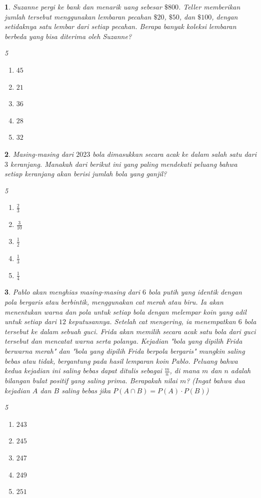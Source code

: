 \documentclass[11pt,a4paper,DIV=12]{scrartcl}
\theoremstyle{problemstyle}
\newtheorem{problem}{}
\theoremstyle{answerstyle}
\newenvironment{choices}[1][5]{%
\raggedcolumns
  \begin{multicols}{#1}%
  \begin{enumerate}[label=(\Alph*)]%
}{%
  \end{enumerate}%
  \end{multicols}%
}
\begin{document}
\begin{problem}
  Suzanne pergi ke bank dan menarik uang sebesar $\$800$. Teller memberikan jumlah tersebut menggunakan lembaran pecahan $\$20$, $\$50$, dan $\$100$, dengan setidaknya satu lembar dari setiap pecahan. Berapa banyak koleksi lembaran berbeda yang bisa diterima oleh Suzanne?

  \begin{choices}
    \item $45$
    \item $21$
    \item $36$
    \item $28$
    \item $32$
  \end{choices}
\end{problem}

\begin{problem}
  Masing-masing dari $2023$ bola dimasukkan secara acak ke dalam salah satu dari $3$ keranjang. Manakah dari berikut ini yang paling mendekati peluang bahwa setiap keranjang akan berisi jumlah bola yang ganjil?
  \begin{choices}
    \item $\frac{2}{3}$
    \item $\frac{3}{10}$
    \item $\frac{1}{2}$
    \item $\frac{1}{3}$
    \item $\frac{1}{4}$
  \end{choices}
\end{problem}

\begin{problem}
  Pablo akan menghias masing-masing dari $6$ bola putih yang identik dengan pola bergaris atau berbintik, menggunakan cat merah atau biru. Ia akan menentukan warna dan pola untuk setiap bola dengan melempar koin yang adil untuk setiap dari $12$ keputusannya. Setelah cat mengering, ia menempatkan $6$ bola tersebut ke dalam sebuah guci. Frida akan memilih secara acak satu bola dari guci tersebut dan mencatat warna serta polanya. Kejadian "bola yang dipilih Frida berwarna merah" dan "bola yang dipilih Frida berpola bergaris" mungkin saling bebas atau tidak, bergantung pada hasil lemparan koin Pablo. Peluang bahwa kedua kejadian ini saling bebas dapat ditulis sebagai $\frac{m}{n}$, di mana $m$ dan $n$ adalah bilangan bulat positif yang saling prima. Berapakah nilai $m$? (\emph{Ingat bahwa dua kejadian $A$ dan $B$ saling bebas jika $P(A \cap B) = P(A) \cdot P(B)$})
  \begin{choices}
    \item $243$
    \item $245$
    \item $247$
    \item $249$
    \item $251$
  \end{choices}
\end{problem}
\end{document}
